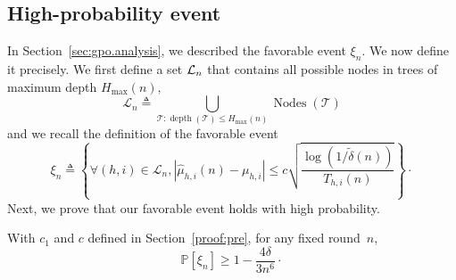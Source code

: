 \subsection{High-probability event}\label{proof:lemma_event}

In Section~\ref{sec:gpo.analysis}, we described the favorable event $\xi_n$.  We now define it precisely. We first define a set $\mathcal{L}_n$ that contains all possible nodes in trees of maximum depth $H_{\max}(n),$
\[
\mathcal{L}_n \triangleq \bigcup\limits_{\mathcal{T}:\operatorname{depth}(\mathcal{T})\leq H_{\max}(n)} \operatorname{Nodes}(\mathcal{T})
\]
and we recall the definition of the favorable event
\[
\xi_n \triangleq \left\{ \forall (h,i)\in\mathcal{L}_n,  |\hat{\mu}_{h,i}(n) - \mu_{h,i}| \leq c\sqrt{\frac{\log(1/\tilde{\delta}(n))}{T_{h,i}(n)}} \right\}\!\cdot\]
Next, we prove that our favorable event holds with high probability.

\begin{lemma} \label{lemma_event}
With $c_1$ and $c$ defined in Section~\ref{proof:pre}, for any fixed round~$n$,
\[
\mathbb{P}\left[ \xi_n \right] \geq 1-\frac{4\delta}{3n^6}\cdot
\]
\end{lemma}

